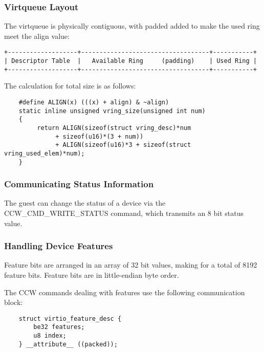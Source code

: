 \subsubsection{Virtqueue Layout}\label{sec:Virtio Transport Options / Virtio over channel I/O / Device Initialization / Virtqueue Layout}

The virtqueue is physically contiguous, with padded added to make the
used ring meet the align value:

\begin{verbatim}
+-------------------+-----------------------------------+-----------+
| Descriptor Table  |   Available Ring     (padding)    | Used Ring |
+-------------------+-----------------------------------+-----------+
\end{verbatim}

The calculation for total size is as follows:

\begin{lstlisting}
	#define ALIGN(x) (((x) + align) & ~align)
	static inline unsigned vring_size(unsigned int num)
	{
	     return ALIGN(sizeof(struct vring_desc)*num
			  + sizeof(u16)*(3 + num))
	          + ALIGN(sizeof(u16)*3 + sizeof(struct vring_used_elem)*num);
	}
\end{lstlisting}

\subsubsection{Communicating Status Information}\label{sec:Virtio Transport Options / Virtio over channel I/O / Device Initialization / Communicating Status Information}

The guest can change the status of a device via the
CCW_CMD_WRITE_STATUS command, which transmits an 8 bit status
value.

\subsubsection{Handling Device Features}\label{sec:Virtio Transport Options / Virtio over channel I/O / Device Initialization / Handling Device Features}

Feature bits are arranged in an array of 32 bit values, making
for a total of 8192 feature bits. Feature bits are in
little-endian byte order.

The CCW commands dealing with features use the following
communication block:

\begin{lstlisting}
	struct virtio_feature_desc {
		be32 features;
		u8 index;
	} __attribute__ ((packed));
\end{lstlisting}

